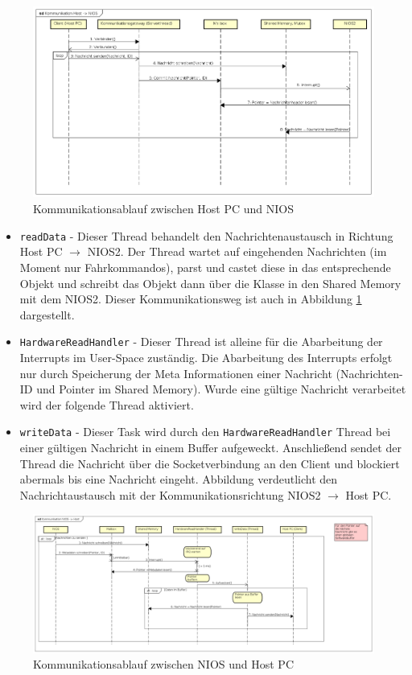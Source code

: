\begin{figure}
	\includegraphics[width=\textwidth]{Abb/Komm_Host_NIOS.png}
	\caption{Kommunikationsablauf zwischen Host PC und NIOS}
	\label{SW:Komm:HOSTNIOS}
\end{figure}

\begin{itemize}
	\item \lstinline|readData| - Dieser Thread behandelt den Nachrichtenaustausch in Richtung Host PC $\rightarrow$ NIOS2. Der Thread wartet auf eingehenden Nachrichten (im Moment nur Fahrkommandos), parst und castet diese in das entsprechende Objekt und schreibt das Objekt dann über die Klasse  in den Shared Memory mit dem NIOS2. Dieser Kommunikationsweg ist auch in Abbildung \ref{SW:Komm:HOSTNIOS} dargestellt.
	\item \lstinline|HardwareReadHandler| - Dieser Thread ist alleine für die Abarbeitung der Interrupts im User-Space zuständig. Die Abarbeitung des Interrupts erfolgt nur durch Speicherung der Meta Informationen einer Nachricht (Nachrichten-ID und Pointer im Shared Memory). Wurde eine gültige Nachricht verarbeitet wird der folgende Thread aktiviert.
	\item \lstinline|writeData| - Dieser Task wird durch den \lstinline|HardwareReadHandler| Thread bei einer gültigen Nachricht in einem Buffer aufgeweckt. Anschließend sendet der Thread die Nachricht über die Socketverbindung an den Client und blockiert abermals bis eine Nachricht eingeht. Abbildung verdeutlicht den Nachrichtaustausch mit der Kommunikationsrichtung NIOS2 $\rightarrow$ Host PC.
\end{itemize}

\begin{figure}
	\includegraphics[width=\textwidth]{Abb/Komm_NIOS_Host.png}
	\caption{Kommunikationsablauf zwischen NIOS und Host PC}
	\label{SW:Komm:NIOSHOST}
\end{figure}


